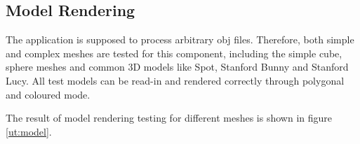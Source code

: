 \subsection{Model Rendering}

The application is supposed to process arbitrary obj files. Therefore, both simple and complex meshes are tested for this component, including the simple cube, sphere meshes and common 3D models like Spot, Stanford Bunny and Stanford Lucy. All test models can be read-in and rendered correctly through polygonal and coloured mode.

\hspace*{\fill}

The result of model rendering testing for different meshes is shown in figure \ref{ut:model}.

\begin{figure}[htbp]
    \centering
    

\end{figure}
